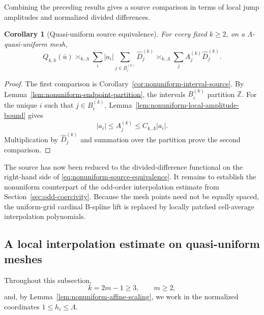 \documentclass[11pt]{amsart}
\theoremstyle{plain}
\newtheorem{corollary}[theorem]{Corollary}
\theoremstyle{definition}
\theoremstyle{remark}
\numberwithin{equation}{section}
\theoremstyle{plain}
\begin{document}
Combining the preceding results gives a source comparison in terms of
local jump amplitudes and normalized divided differences.

\begin{corollary}[Quasi-uniform source equivalence]
	\label{cor:nonuniform-source-equivalence}
	For every fixed $k\ge2$, on a $\Lambda$-quasi-uniform mesh,
	\begin{equation}\label{eq:nonuniform-source-equivalence}
		Q_{k,h}(\bar u)
		\asymp_{k,\Lambda}
		\sum_i|a_i|
		\sum_{j\in B_i^{(k)}}\widehat D_j^{(k)}
		\asymp_{k,\Lambda}
		\sum_jA_j^{(k)}\widehat D_j^{(k)}.
	\end{equation}
\end{corollary}

\begin{proof}
	The first comparison is
	Corollary~\ref{cor:nonuniform-interval-source}.  By
	Lemma~\ref{lem:nonuniform-endpoint-partition}, the intervals
	$B_i^{(k)}$ partition $\mathbb Z$.  For the unique $i$ such that
	$j\in B_i^{(k)}$, Lemma~\ref{lem:nonuniform-local-amplitude-bound} gives
	\[
	|a_i|\le A_j^{(k)}
	\le C_{k,\Lambda}|a_i|.
	\]
	Multiplication by $\widehat D_j^{(k)}$ and summation over the partition prove
	the second comparison.
\end{proof}

The source has now been reduced to the divided-difference functional on the
right-hand side of \eqref{eq:nonuniform-source-equivalence}.  It remains to
establish the nonuniform counterpart of the odd-order interpolation estimate
from Section~\ref{sec:odd-coercivity}.  Because the mesh points need not
be equally spaced, the uniform-grid cardinal B-spline lift is replaced by
locally patched cell-average interpolation polynomials.

\subsection{A local interpolation estimate on quasi-uniform meshes}
\label{sec:quasi-uniform-interpolation}

Throughout this subsection,
\begin{equation}\label{eq:quasi-odd-parameters}
	k=2m-1\ge3,
	\qquad m\ge2,
\end{equation}
and, by Lemma~\ref{lem:nonuniform-affine-scaling}, we work in the normalized
coordinates $1\le h_i\le\Lambda$.
\end{document}
